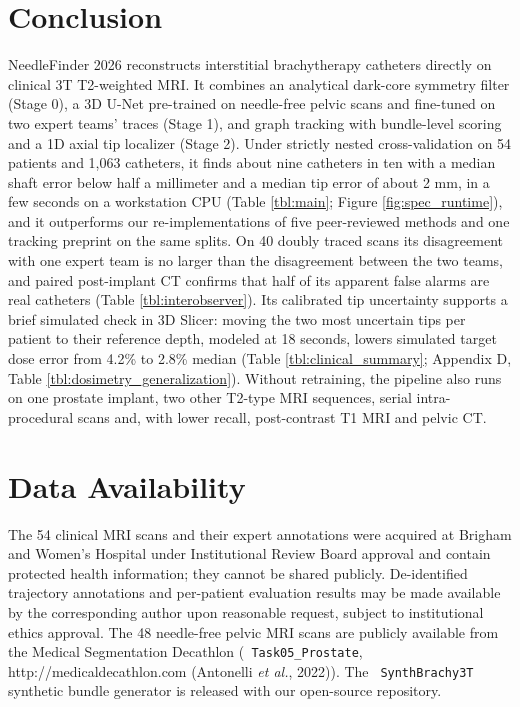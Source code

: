 \documentclass[
  11pt,
]{article}
\let\nforigtexttt\texttt
\renewcommand{\texttt}[1]{\nforigtexttt{\XeTeXinterchartokenstate=1 #1}}
\begin{document}
\FloatBarrier

\section{Conclusion}\label{conclusion}

NeedleFinder 2026 reconstructs interstitial brachytherapy catheters
directly on clinical 3T T2-weighted MRI. It combines an analytical
dark-core symmetry filter (Stage 0), a 3D U-Net pre-trained on
needle-free pelvic scans and fine-tuned on two expert teams' traces
(Stage 1), and graph tracking with bundle-level scoring and a 1D axial
tip localizer (Stage 2). Under strictly nested cross-validation on 54
patients and 1,063 catheters, it finds about nine catheters in ten with
a median shaft error below half a millimeter and a median tip error of
about 2 mm, in a few seconds on a workstation CPU (Table \ref{tbl:main};
Figure \ref{fig:spec_runtime}), and it outperforms our
re-implementations of five peer-reviewed methods and one tracking
preprint on the same splits. On 40 doubly traced scans its disagreement
with one expert team is no larger than the disagreement between the two
teams, and paired post-implant CT confirms that half of its apparent
false alarms are real catheters (Table \ref{tbl:interobserver}). Its
calibrated tip uncertainty supports a brief simulated check in 3D
Slicer: moving the two most uncertain tips per patient to their
reference depth, modeled at 18 seconds, lowers simulated target dose
error from 4.2\% to 2.8\% median (Table \ref{tbl:clinical_summary};
Appendix D, Table \ref{tbl:dosimetry_generalization}). Without
retraining, the pipeline also runs on one prostate implant, two other
T2-type MRI sequences, serial intra-procedural scans and, with lower
recall, post-contrast T1 MRI and pelvic CT.

\FloatBarrier

\section*{Data Availability}\label{data-availability}

The 54 clinical MRI scans and their expert annotations were acquired at
Brigham and Women's Hospital under Institutional Review Board approval
and contain protected health information; they cannot be shared
publicly. De-identified trajectory annotations and per-patient
evaluation results may be made available by the corresponding author
upon reasonable request, subject to institutional ethics approval. The
48 needle-free pelvic MRI scans are publicly available from the Medical
Segmentation Decathlon (\texttt{Task05\_Prostate},
http://medicaldecathlon.com (Antonelli \emph{et al.}, 2022)). The
\texttt{SynthBrachy3T} synthetic bundle generator is released with our
open-source repository.
\end{document}
